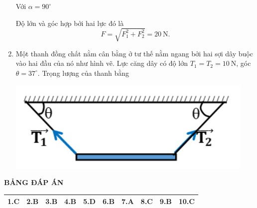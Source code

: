 \begin{enumerate}[label=\bfseries Câu \arabic*:]
{		Với $\alpha=90^\circ$
		
		Độ lớn và góc hợp bởi hai lực đó là 
		$$F=\sqrt{F_1^2+F_2^2}=20\ \text{N}.$$
		
		
	}
	
	\item {}
	
	{ Một thanh đồng chất nằm cân bằng ở tư thế nằm ngang bởi hai sợi dây buộc vào hai đầu của nó như hình vẽ. Lực căng dây có độ lớn $T_1=T_2=\SI{10}{\newton}$, góc $\theta=37^\circ$. Trọng lượng của thanh bằng
		\begin{center}
			\includegraphics[scale=0.7]{../figs/VN10-2021-PH-TP011-5.jpg}
		\end{center}
		
		
	}
\end{enumerate}



\hideall
{
	\begin{center}
		\textbf{BẢNG ĐÁP ÁN}
	\end{center}
	\begin{center}
		\begin{tabular}{|m{2.8em}|m{2.8em}|m{2.8em}|m{2.8em}|m{2.8em}|m{2.8em}|m{2.8em}|m{2.8em}|m{2.8em}|m{2.8em}|}
			\hline
			1.C  & 2.B  & 3.B  & 4.B  & 5.D  & 6.B  & 7.A  & 8.C  & 9.B  & 10.C  \\
			\hline
			
		\end{tabular}
	\end{center}
}
